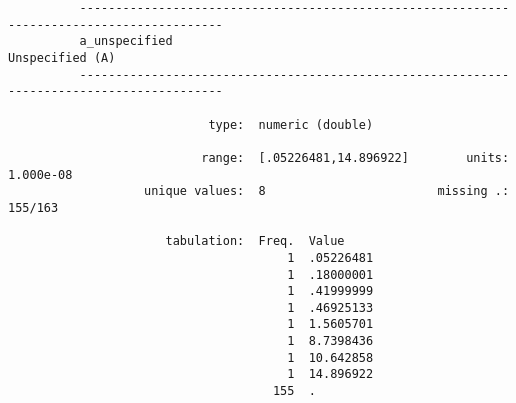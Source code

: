 \documentclass{article}
\begin{document}
\begin{verbatim}
          ------------------------------------------------------------------------------------------
          a_unspecified                                                              Unspecified (A)
          ------------------------------------------------------------------------------------------
          
                            type:  numeric (double)
          
                           range:  [.05226481,14.896922]        units:  1.000e-08
                   unique values:  8                        missing .:  155/163
          
                      tabulation:  Freq.  Value
                                       1  .05226481
                                       1  .18000001
                                       1  .41999999
                                       1  .46925133
                                       1  1.5605701
                                       1  8.7398436
                                       1  10.642858
                                       1  14.896922
                                     155  .
          
          
\end{verbatim}
\end{document}
